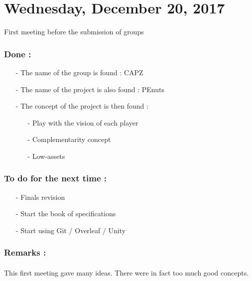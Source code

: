 \documentclass[12pt]{article}
\begin{document}
\section*{Wednesday, December 20, 2017}
First meeting before the submission of groups
	\subsubsection*{Done :}
      \begin{itemize}
        \item[-] The name of the group is found : \large CAPZ \normalsize
        \item[-] The name of the project is also found : \large PEnuts \normalsize
        \item[-] The concept of the project is then found : 
        	\begin{itemize}
            	\item[-] Play with the vision of each player
                \item[-] Complementarity concept
                \item[-] Low-assets
            \end{itemize}
      \end{itemize}
    
    \subsubsection*{To do for the next time :}
      \begin{itemize}
        \item[-] Finals revision 
        \item[-] Start the book of specifications
        \item[-] Start using Git / Overleaf / Unity
      \end{itemize}
    
	\subsubsection*{Remarks :}
		\paragraph{} This first meeting gave many ideas. There were in fact too much good concepts.%
\newpage
\end{document}
